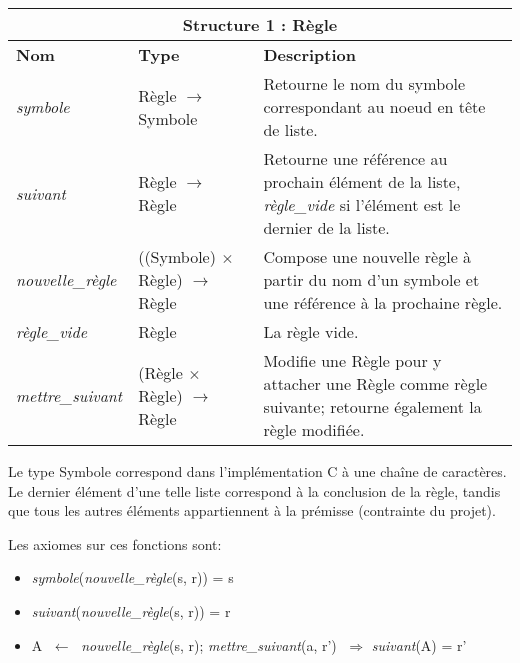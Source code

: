 \documentclass[12pt]{article}
\newcommand{\Assign}[2]{#1 $\; \longleftarrow \;$ #2}
\begin{document}




\begin{tabular}{|p{3cm}|p{4cm}|p{6.5cm}|}
  \hline
  \multicolumn{3}{|c|}{\textbf{Structure 1 :} Règle\label{R}} \\
  \hline
  \textbf{Nom} & \textbf{Type} & \textbf{Description} \\
  \hline
  \textit{symbole} & Règle $\rightarrow$ Symbole & Retourne le nom du symbole correspondant au noeud en tête de liste. \\
  \hline
  \textit{suivant} & Règle $\rightarrow$ Règle & Retourne une référence au prochain élément de la liste, \textit{règle\_vide} si l'élément est le dernier de la liste. \\
  \hline
  \textit{nouvelle\_règle} & ((Symbole) $\times$ Règle) $\rightarrow$ Règle & Compose une nouvelle règle à partir du nom d'un symbole et une référence à la prochaine règle. \\
  \hline
  \textit{règle\_vide} & Règle & La règle vide. \\
  \hline
  \textit{mettre\_suivant} & (Règle $\times$ Règle) $\rightarrow$ Règle & Modifie une Règle pour y attacher une Règle comme règle suivante; retourne également la règle modifiée. \\
  \hline
\end{tabular}

Le type \og Symbole \fg correspond dans l'implémentation C à une chaîne de caractères.
Le dernier élément d'une telle liste correspond à la conclusion de la règle, tandis que tous les autres éléments appartiennent à la prémisse (contrainte du projet).

Les axiomes sur ces fonctions sont:

\begin{itemize}
\item \textit{symbole}(\textit{nouvelle\_règle}(s, r)) = s
\item \textit{suivant}(\textit{nouvelle\_règle}(s, r)) = r
\item \Assign{A}{\textit{nouvelle\_règle}(s, r)}; \textit{mettre\_suivant}(a, r') $\; \Rightarrow$ \textit{suivant}(A) = r'
\end{itemize}
\end{document}
